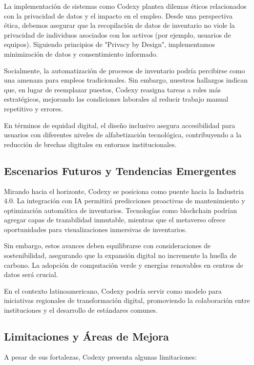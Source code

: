 La implementación de sistemas como Codexy plantea dilemas éticos relacionados con la privacidad de datos y el impacto en el empleo. Desde una perspectiva ética, debemos asegurar que la recopilación de datos de inventario no viole la privacidad de individuos asociados con los activos (por ejemplo, usuarios de equipos). Siguiendo principios de "Privacy by Design", implementamos minimización de datos y consentimiento informado.

Socialmente, la automatización de procesos de inventario podría percibirse como una amenaza para empleos tradicionales. Sin embargo, nuestros hallazgos indican que, en lugar de reemplazar puestos, Codexy reasigna tareas a roles más estratégicos, mejorando las condiciones laborales al reducir trabajo manual repetitivo y errores.

En términos de equidad digital, el diseño inclusivo asegura accesibilidad para usuarios con diferentes niveles de alfabetización tecnológica, contribuyendo a la reducción de brechas digitales en entornos institucionales.

\subsection{Escenarios Futuros y Tendencias Emergentes}

Mirando hacia el horizonte, Codexy se posiciona como puente hacia la Industria 4.0. La integración con IA permitirá predicciones proactivas de mantenimiento y optimización automática de inventarios. Tecnologías como blockchain podrían agregar capas de trazabilidad inmutable, mientras que el metaverso ofrece oportunidades para visualizaciones inmersivas de inventarios.

Sin embargo, estos avances deben equilibrarse con consideraciones de sostenibilidad, asegurando que la expansión digital no incremente la huella de carbono. La adopción de computación verde y energías renovables en centros de datos será crucial.

En el contexto latinoamericano, Codexy podría servir como modelo para iniciativas regionales de transformación digital, promoviendo la colaboración entre instituciones y el desarrollo de estándares comunes.

\subsection{Limitaciones y Áreas de Mejora}

A pesar de sus fortalezas, Codexy presenta algunas limitaciones:

